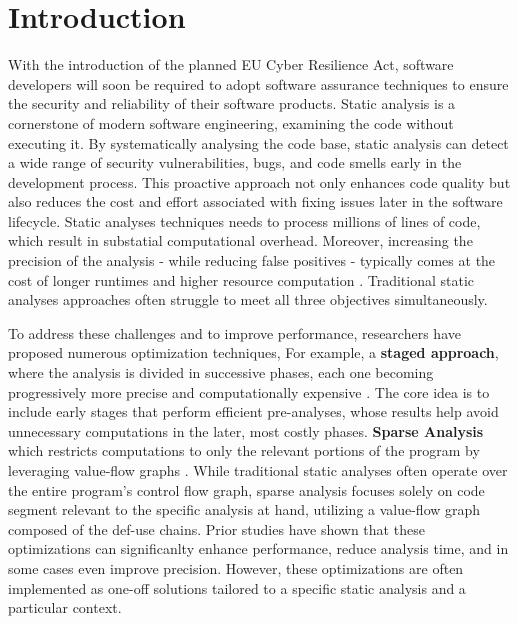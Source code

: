 \section{Introduction}
With the introduction of the planned EU Cyber Resilience Act, software developers will soon be required to adopt software assurance techniques to ensure the security and reliability of their software products.
Static analysis is a cornerstone of modern software engineering, examining the code without executing it.
By systematically analysing the code base, static analysis can detect a wide range of security vulnerabilities, bugs, and code smells early in the development process.
This proactive approach not only enhances code quality but also reduces the cost and effort associated with fixing issues later in the software lifecycle.
Static analyses techniques needs to process millions of lines of code, which result in substatial computational overhead.
Moreover, increasing the precision of the analysis - while reducing false positives - typically comes at the cost of longer runtimes and higher resource computation \cite{emanuelsson2008comparative}.
Traditional static analyses approaches often struggle to meet all three objectives simultaneously.

To address these challenges and to improve performance, researchers have proposed numerous optimization techniques, 
For example, a \textbf{staged approach}, where the analysis is divided in successive phases,
each one becoming progressively more precise and computationally expensive \cite{bodden2009verifying,bodden2012partially,jeong2017datadriven,li2018precision,lu2019precision,sinha2010staged,smaragdakis2014introspective}.
The core idea is to include early stages that perform efficient pre-analyses, whose results help avoid unnecessary computations in the later, most costly phases.
\textbf{Sparse Analysis} which restricts computations to only the relevant portions of the program by leveraging value-flow graphs \cite{choi1991automatic,madsen2014sparse,ramalingam2002sparse,spaeth2017ideal}.
While traditional static analyses often operate over the entire program's control flow graph, sparse analysis focuses solely on code segment relevant to the specific analysis at hand, utilizing a value-flow graph composed of the def-use chains.
Prior studies have shown that these optimizations can significanlty enhance performance, reduce analysis time, and in some cases even improve precision. 
However, these optimizations are often implemented as one-off solutions tailored to a specific static analysis and a particular context.

